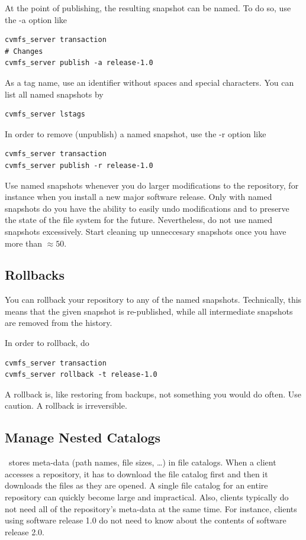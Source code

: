 At the point of publishing, the resulting snapshot can be named. 
To do so, use the -a option like
\begin{verbatim}
cvmfs_server transaction
# Changes
cvmfs_server publish -a release-1.0
\end{verbatim}

As a tag name, use an identifier without spaces and special characters. 
You can list all named snapshots by 
\begin{verbatim}
cvmfs_server lstags
\end{verbatim}

In order to remove (unpublish) a named snapshot, use the -r option like
\begin{verbatim}
cvmfs_server transaction
cvmfs_server publish -r release-1.0
\end{verbatim}

Use named snapshots whenever you do larger modifications to the repository, for instance when you install a new major software release.
Only with named snapshots do you have the ability to easily undo modifications and to preserve the state of the file system for the future. 
Nevertheless, do not use named snapshots excessively. 
Start cleaning up unneccesary snapshots once you have more than $\approx 50$.

\subsection{Rollbacks}

You can rollback your repository to any of the named snapshots. 
Technically, this means that the given snapshot is re-published, while all intermediate snapshots are removed from the history.

In order to rollback, do
\begin{verbatim}
cvmfs_server transaction
cvmfs_server rollback -t release-1.0
\end{verbatim}

A rollback is, like restoring from backups, not something you would do often. 
Use caution. 
A rollback is irreversible.

\subsection{Manage Nested Catalogs}

\cvmfs\ stores meta-data (path names, file sizes, \dots) in file catalogs. 
When a client accesses a repository, it has to download the file catalog first and then it downloads the files as they are opened. 
A single file catalog for an entire repository can quickly become large and impractical. 
Also, clients typically do not need all of the repository's meta-data at the same time. 
For instance, clients using software release 1.0 do not need to know about the contents of software release 2.0.

